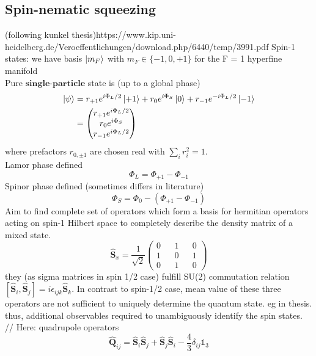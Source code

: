 \subsection{Spin-nematic squeezing} (following kunkel thesis)https://www.kip.uni-heidelberg.de/Veroeffentlichungen/download.php/6440/temp/3991.pdf
Spin-1 states: we have basis $\ket{m_F}$ with $m_F \in \{-1,0,+1\}$ for the F = 1 hyperfine manifold
\\ 
Pure $\textbf{single-particle}$ state is (up to a global phase)
\begin{align}
	\ket{\psi} &= r_{+1} e^{i \Phi_L /2} \ket{+1} + r_0 e^{i\Phi_S} \ket{0} + r_{-1} e^{-i \Phi_L /2} \ket{-1}
	\\
	& = \left (
	\begin{matrix}
		r_{+1}e^{i \Phi_L/2}
		\\
		r_0 e^{i\Phi_S}
		\\
		r_{-1} e^{i \Phi_L/2}
	\end{matrix} \right )
\end{align}
where prefactors $r_{0,\pm 1}$ are chosen real with $\sum_i r_i^2 = 1$. 
\\
Lamor phase defined
\begin{equation}
	\Phi_L = \Phi_{+1}- \Phi_{-1}
\end{equation}
Spinor phase defined (sometimes differs in literature)
\begin{equation}
	\Phi_S = \Phi_0 - ( \Phi_{+1} - \Phi_{-1})
\end{equation}
Aim to find complete set of operators which form a basis for hermitian operators acting on spin-1 Hilbert space to completely describe the density matrix of a mixed state. 
\begin{equation}
	\hat{\bm{S}}_x = \frac{1}{\sqrt{2}}\left( 
		\begin{matrix}
				0 && 1 && 0
				\\
				1 && 0 && 1
				\\
				0 && 1 && 0
		\end{matrix} \right)
\end{equation}
they (as sigma matrices in spin 1/2 case) fulfill SU(2) commutation relation $[\hat{\bm{S}}_i,\hat{\bm{S}}_j] =i \epsilon_{ijk} \hat{\bm{S}}_k$. In contrast to spin-1/2 case, mean value of these three operators are not sufficient to uniquely determine the quantum state. eg in thesis. thus, additional observables required to unambiguously identify the spin states.
//
Here: quadrupole operators
\begin{equation}
	\hat{\bm{Q}}_{ij} = \hat{\bm{S}}_i \hat{\bm{S}}_j + \hat{\bm{S}}_j \hat{\bm{S}}_i - \frac{4}{3} \delta_{ij} \mathds{1}_3
\end{equation}
